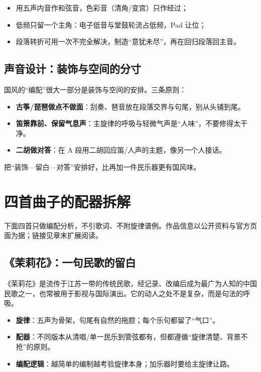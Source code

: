 \begin{itemize}
\item 用五声内音作和弦音，色彩音（清角/变宫）只作经过；
\item 低频只留一个主角：电子低音与堂鼓轮流占低频，Pad 让位；
\item 段落转折可用一次不完全解决，制造“意犹未尽”，再在回归段落回主音。
\end{itemize}

\subsection{声音设计：装饰与空间的分寸}
\label{sec:guofeng-sound}

国风的“编配”很大一部分是装饰与空间的安排。三条原则：

\begin{itemize}
\item \textbf{古筝/琵琶做点不做面}：刮奏、琶音放在段落交界与句尾，别从头铺到尾。
\item \textbf{笛箫靠前、保留气息声}：主旋律的呼吸与轻微气声是“人味”，不要修得太干净。
\item \textbf{二胡做对答}：在 A 段用二胡回应笛/人声的主题，像另一个人接话。
\end{itemize}

把“装饰—留白—对答”安排好，比再加一件民乐器更有国风味。

\section{四首曲子的配器拆解}
\label{sec:guofeng-cases}

下面四首只做编配分析，不引歌词、不附旋律谱例。作品信息以公开资料与官方页面为据；链接见章末扩展阅读。

\subsection{《茉莉花》：一句民歌的留白}
\label{sec:guofeng-case-jasmine}

《茉莉花》是流传于江苏一带的传统民歌，经记录、改编后成为最广为人知的中国民歌之一，也常被用于影视与国际演出。它的动人之处不是复杂，而是句法的呼吸。

\begin{itemize}
\item \textbf{旋律}：五声为骨架，句尾有自然的拖腔；每个乐句都留了“气口”。
\item \textbf{配器}：不同版本从清唱/单一民乐到管弦都有，但都遵循“旋律清楚、背景不抢”的原则。
\item \textbf{编配逻辑}：越简单的编制越考验旋律本身；加乐器时要给主旋律让路。
\end{itemize}

